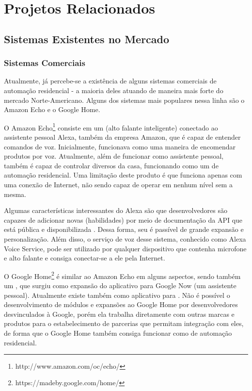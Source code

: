\chapter{Projetos Relacionados}

\section{Sistemas Existentes no Mercado}

\subsection{Sistemas Comerciais}
Atualmente, já percebe-se a existência de alguns sistemas comerciais de automação residencial - a maioria deles atuando de maneira mais forte do mercado Norte-Americano. Alguns dos sistemas mais populares nessa linha são o Amazon Echo e o Google Home.

O Amazon Echo\footnote{http://www.amazon.com/oc/echo/} consiste em um  (alto falante inteligente) conectado ao assistente pessoal Alexa, também da empresa Amazon, que é capaz de entender comandos de voz. Inicialmente, funcionava como uma maneira de encomendar produtos por voz. Atualmente, além de funcionar como assistente pessoal, também é capaz de controlar diversos  da casa, funcionando como um  de automação residencial. Uma limitação deste produto é que funciona apenas com uma conexão  de Internet, não sendo capaz de operar em nenhum nível sem a mesma.

Algumas características interessantes do Alexa são que desenvolvedores são capazes de adicionar novas  (habilidades) por meio de documentação da API que está pública e disponibilizada . Dessa forma, seu  é passível de grande expansão e personalização. Além disso, o serviço de voz desse sistema, conhecido como Alexa Voice Service, pode ser utilizado por qualquer dispositivo que contenha microfone e alto falante e consiga conectar-se a ele pela Internet.

O Google Home\footnote{https://madeby.google.com/home/} é similar ao Amazon Echo em alguns aspectos, sendo também um , que surgiu como expansão do aplicativo para  Google Now (um assistente pessoal). Atualmente existe também como aplicativo para . Não é possível o desenvolvimento de módulos e expansões ao Google Home por desenvolvedores desvinculados à Google, porém ela trabalha diretamente com outras marcas e produtos para o estabelecimento de parcerias que permitam integração com eles, de forma que o Google Home também consiga funcionar como  de automação residencial.

